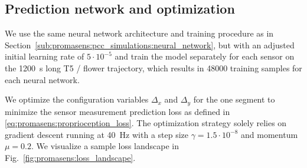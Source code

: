 \subsection{Prediction network and optimization}\label{sub:promasens:experiments_neural_network}
We use the same neural network architecture and training procedure as in Section~\ref{sub:promasens:pcc_simulations:neural_network}, but with an adjusted initial learning rate of $5 \cdot 10^{-5}$ and train the model separately for each sensor on the \SI{1200}{s} long T5 / flower trajectory, which results in \SI{48000}{} training samples for each neural network.

We optimize the configuration variables $\Delta_x$ and $\Delta_y$ for the one segment to minimize the sensor measurement prediction loss as defined in \eqref{eq:promasens:proprioception_loss}.
The optimization strategy solely relies on gradient descent running at \SI{40}{Hz} %
with a step size $\gamma = 1.5 \cdot 10^{-8}$ and momentum $\mu = 0.2$. %
We visualize a sample loss landscape in Fig.~\ref{fig:promasens:loss_landscape}.

